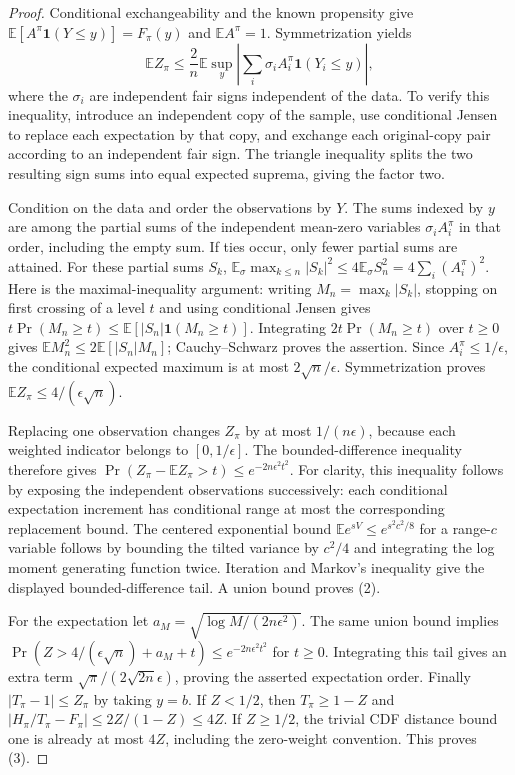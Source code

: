\documentclass[11pt]{article}
\theoremstyle{remark}
\newcommand{\E}{\mathbb E}
\newcommand{\Ind}{\mathbf 1}
\begin{document}
\begin{proof}
Conditional exchangeability and the known propensity give
$\E[A^\pi\Ind(Y\leq y)]=F_\pi(y)$ and $\E A^\pi=1$.
Symmetrization yields
\[
 \E Z_\pi\leq\frac2n\E\sup_y
       \left|\sum_i\sigma_i A_i^\pi\Ind(Y_i\leq y)\right|,
\]
where the $\sigma_i$ are independent fair signs independent of the data.
To verify this inequality, introduce an independent copy of the sample,
use conditional Jensen to replace each expectation by that copy, and
exchange each original-copy pair according to an independent fair sign.
The triangle inequality splits the two resulting sign sums into equal
expected suprema, giving the factor two.

Condition on the data and order the observations by $Y$. The sums indexed
by $y$ are among the partial sums of the independent mean-zero variables
$\sigma_i A_i^\pi$ in that order, including the empty sum. If ties occur,
only fewer partial sums are attained. For these partial sums $S_k$,
$\E_\sigma\max_{k\leq n}|S_k|^2\leq4\E_\sigma S_n^2
=4\sum_i(A_i^\pi)^2$. Here is the maximal-inequality argument: writing
$M_n=\max_k|S_k|$, stopping on first crossing of a level $t$ and using
conditional Jensen gives
$t\Pr(M_n\geq t)\leq\E[|S_n|\Ind(M_n\geq t)]$.
Integrating $2t\Pr(M_n\geq t)$ over $t\geq0$ gives
$\E M_n^2\leq2\E[|S_n|M_n]$; Cauchy--Schwarz proves the assertion.
Since $A_i^\pi\leq1/\epsilon$, the conditional expected maximum is at
most $2\sqrt n/\epsilon$. Symmetrization proves
$\E Z_\pi\leq4/(\epsilon\sqrt n)$.

Replacing one observation changes $Z_\pi$ by at most $1/(n\epsilon)$,
because each weighted indicator belongs to $[0,1/\epsilon]$.
The bounded-difference inequality therefore gives
$\Pr(Z_\pi-\E Z_\pi>t)\leq e^{-2n\epsilon^2t^2}$.
For clarity, this inequality follows by exposing the independent
observations successively: each conditional expectation increment has
conditional range at most the corresponding replacement bound. The
centered exponential bound $\E e^{sV}\leq e^{s^2c^2/8}$ for a range-$c$
variable follows by bounding the tilted variance by $c^2/4$ and integrating
the log moment generating function twice. Iteration and Markov's inequality
give the displayed bounded-difference tail. A union bound proves (2).

For the expectation let $a_M=\sqrt{\log M/(2n\epsilon^2)}$.
The same union bound implies
$\Pr(Z>4/(\epsilon\sqrt n)+a_M+t)\leq e^{-2n\epsilon^2t^2}$
for $t\geq0$. Integrating this tail gives an extra term
$\sqrt\pi/(2\sqrt{2n}\epsilon)$, proving the asserted expectation order.
Finally $|T_\pi-1|\leq Z_\pi$ by taking $y=b$. If $Z<1/2$, then
$T_\pi\geq1-Z$ and
$|H_\pi/T_\pi-F_\pi|\leq2Z/(1-Z)\leq4Z$.
If $Z\geq1/2$, the trivial CDF distance bound one is already at most
$4Z$, including the zero-weight convention. This proves (3).
\end{proof}
\end{document}
